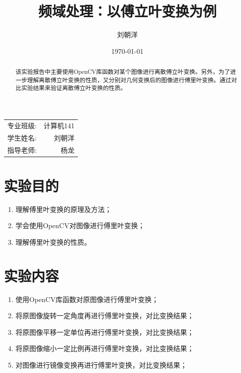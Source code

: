 \documentclass[hyperref,UTF8]{ctexart}
\title{频域处理：以傅立叶变换为例} %
\author{\kaishu 刘朝洋} %
\date{\today} %
\begin{document}
\maketitle %

\begin{center}
\begin{tabular}{l r}
专业班级: & 计算机141 \\ %
学生姓名: & 刘朝洋 \\ %
指导老师: & 杨龙 %
\end{tabular}
\end{center}

\begin{abstract}
该实验报告中主要使用OpenCV库函数对某个图像进行离散傅立叶变换。另外，为了进一步理解离散傅立叶变换的性质，又分别对几何变换后的图像进行傅里叶变换。通过对比实验结果来验证离散傅立叶变换的性质。
\end{abstract}

\pagestyle{plain}

\section{实验目的}

\begin{enumerate}

\item 理解傅里叶变换的原理及方法；
\item 学会使用OpenCV对图像进行傅里叶变换；
\item 理解傅里叶变换的性质。

\end{enumerate}
 

\section{实验内容}

\begin{enumerate}

\item 使用OpenCV库函数对原图像进行傅里叶变换；
\item 将原图像旋转一定角度再进行傅里叶变换，对比变换结果；
\item 将原图像平移一定单位再进行傅里叶变换，对比变换结果；
\item 将原图像缩小一定比例再进行傅里叶变换，对比变换结果；
\item 对图像进行镜像变换再进行傅里叶变换，对比变换结果；

\end{enumerate}
\end{document}
